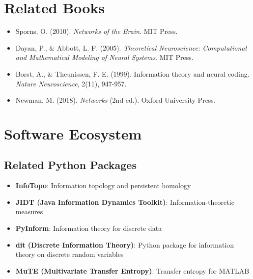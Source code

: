 \documentclass[
  11pt,
  letterpaper,
  oneside,
  openany]{book}
\providecommand{\tightlist}{%
  \setlength{\itemsep}{0pt}\setlength{\parskip}{0pt}}
\begin{document}
\section*{Related Books}\label{related-books}


\begin{itemize}
\tightlist
\item
  Sporns, O. (2010). \emph{Networks of the Brain}. MIT Press.
\item
  Dayan, P., \& Abbott, L. F. (2005). \emph{Theoretical Neuroscience:
  Computational and Mathematical Modeling of Neural Systems}. MIT Press.
\item
  Borst, A., \& Theunissen, F. E. (1999). Information theory and neural
  coding. \emph{Nature Neuroscience}, 2(11), 947-957.
\item
  Newman, M. (2018). \emph{Networks} (2nd ed.). Oxford University Press.
\end{itemize}

\section*{Software Ecosystem}\label{software-ecosystem}


\subsection*{Related Python Packages}\label{related-python-packages}

\begin{itemize}
\tightlist
\item
  \textbf{InfoTopo}: Information topology and persistent homology
\item
  \textbf{JIDT (Java Information Dynamics Toolkit)}:
  Information-theoretic measures
\item
  \textbf{PyInform}: Information theory for discrete data
\item
  \textbf{dit (Discrete Information Theory)}: Python package for
  information theory on discrete random variables
\item
  \textbf{MuTE (Multivariate Transfer Entropy)}: Transfer entropy for
  MATLAB
\end{itemize}
\end{document}

